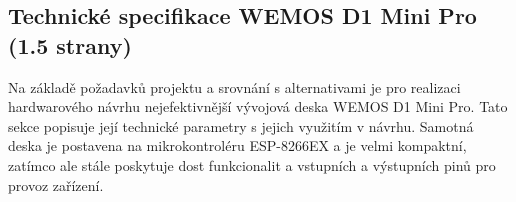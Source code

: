 \subsection{Technické specifikace WEMOS D1 Mini Pro (1.5 strany)}

Na základě požadavků projektu a srovnání s alternativami je pro realizaci hardwarového návrhu nejefektivnější vývojová deska WEMOS D1 Mini Pro. Tato sekce popisuje její technické parametry s jejich využitím v návrhu. Samotná deska je postavena na mikrokontroléru ESP-8266EX a je velmi kompaktní, zatímco ale stále poskytuje dost funkcionalit a vstupních a výstupních pinů pro provoz zařízení.


